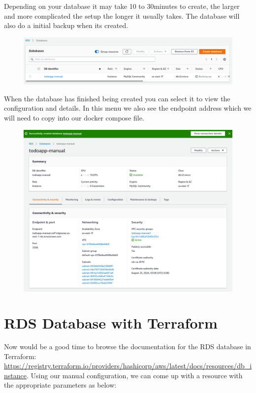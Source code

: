 \documentclass{csse4400}
\begin{document}
Depending on your database it may take 10 to 30minutes to create,
the larger and more complicated the setup the longer it usually takes.
The database will also do a initial backup when its created.

\begin{figure}[H]
  \includegraphics[width=\textwidth]{images/aws_4}
\end{figure}

When the database has finished being created you can select it to view the configuration and details.
In this menu we also see the endpoint address which we will need to copy into our docker compose file.

\begin{figure}[H]
  \includegraphics[width=\textwidth]{images/aws_5}
\end{figure}

\section{RDS Database with Terraform}

Now would be a good time to browse the documentation for the RDS database in Terraform:
\url{https://registry.terraform.io/providers/hashicorp/aws/latest/docs/resources/db_instance}.
Using our manual configuration,
we can come up with a resource with the appropriate parameters as below:
\end{document}
